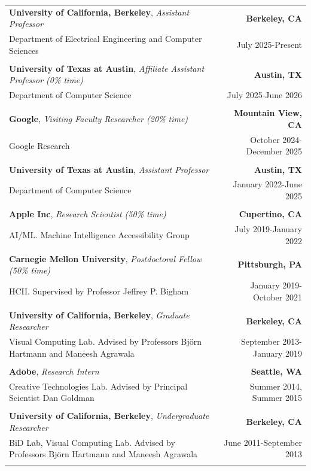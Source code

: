 \begin{longtable}{Xr}
	\textbf{University of California, Berkeley}, \textit{Assistant Professor} & \textbf{Berkeley, CA} \\
	Department of Electrical Engineering and Computer Sciences & July 2025-Present \\
	\\

	\textbf{University of Texas at Austin}, \textit{Affiliate Assistant Professor (0\% time)} & \textbf{Austin, TX} \\
	Department of Computer Science & July 2025-June 2026 \\
	\\

	\textbf{Google}, \textit{Visiting Faculty Researcher (20\% time)} & \textbf{Mountain View, CA} \\
	Google Research & October 2024-December 2025 \\
	\\

	\textbf{University of Texas at Austin}, \textit{Assistant Professor} & \textbf{Austin, TX} \\
	Department of Computer Science & January 2022-June 2025 \\
	\\

	\textbf{Apple Inc}, \textit{Research Scientist (50\% time)} & \textbf{Cupertino, CA} \\
	AI/ML. Machine Intelligence Accessibility Group & July 2019-January 2022 \\
	\\

	\textbf{Carnegie Mellon University}, \textit{Postdoctoral Fellow (50\% time)} & \textbf{Pittsburgh, PA} \\
	HCII. Supervised by Professor Jeffrey P. Bigham & January 2019-October 2021 \\
	\\

	\textbf{University of California, Berkeley}, \textit{Graduate Researcher} & \textbf{Berkeley, CA} \\
	Visual Computing Lab. Advised by Professors Björn Hartmann and Maneesh Agrawala & September 2013-January 2019 \\
	\\

	\textbf{Adobe}, \textit{Research Intern} & \textbf{Seattle, WA} \\
	Creative Technologies Lab. Advised by Principal Scientist Dan Goldman & Summer 2014, Summer 2015 \\
	\\

	\textbf{University of California, Berkeley}, \textit{Undergraduate Researcher} & \textbf{Berkeley, CA} \\
	BiD Lab, Visual Computing Lab. Advised by Professors Björn Hartmann and Maneesh Agrawala & June 2011-September 2013 \\
	\\

\end{longtable}
